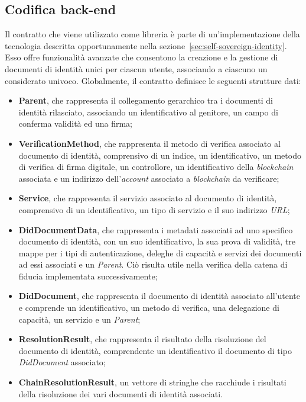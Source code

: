 \subsection{Codifica back-end}\label{subsec:codifica-back-end}
Il contratto che viene utilizzato come libreria è parte di un'implementazione della tecnologia  descritta opportunamente nella
sezione~\ref{sec:self-sovereign-identity}. Esso offre funzionalità avanzate che consentono la creazione e la gestione di documenti di identità
unici per ciascun utente, associando a ciascuno un  considerato univoco.
Globalmente, il contratto definisce le seguenti strutture dati:
\begin{itemize}
    \item \textbf{Parent}, che rappresenta il collegamento gerarchico tra i documenti di identità rilasciato, associando un identificativo al genitore,
    un campo di conferma validità ed una firma;
    \item \textbf{VerificationMethod}, che rappresenta il metodo di verifica associato al documento di identità, comprensivo di un indice, un identificativo,
    un metodo di verifica di firma digitale, un controllore, un identificativo della \textit{blockchain} associata e un indirizzo dell'\textit{account} associato a \textit{blockchain} da verificare;
    \item \textbf{Service}, che rappresenta il servizio associato al documento di identità, comprensivo di un identificativo, un tipo di servizio e il suo indirizzo \textit{URL};
    \item \textbf{DidDocumentData}, che rappresenta i metadati associati ad uno specifico documento di identità, con un suo identificativo, la sua prova di validità, tre mappe per i tipi di autenticazione, deleghe di capacità
    e servizi dei documenti ad essi associati e un \textit{Parent}. Ciò risulta utile nella verifica della catena di fiducia implementata successivamente;
    \item \textbf{DidDocument}, che rappresenta il documento di identità associato all'utente e comprende un identificativo, un metodo di verifica, una delegazione di capacità, un servizio e un \textit{Parent};
    \item \textbf{ResolutionResult}, che rappresenta il risultato della risoluzione del documento di identità, comprendente un identificativo il documento di tipo \textit{DidDocument} associato;
    \item \textbf{ChainResolutionResult}, un vettore di stringhe che racchiude i risultati della risoluzione dei vari documenti di identità associati.
\end{itemize}

